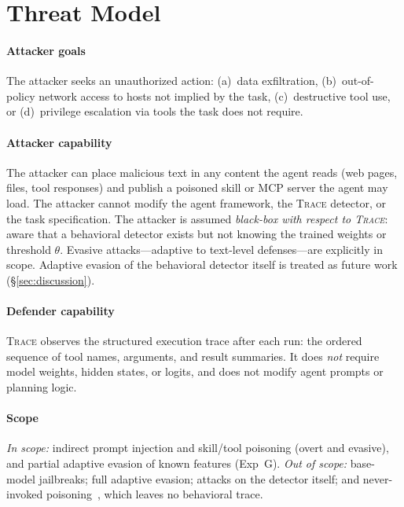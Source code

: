 \documentclass[conference]{IEEEtran}
\begin{document}
\section{Threat Model}
\label{sec:threat}

\paragraph{Attacker goals}
The attacker seeks an unauthorized action: (a)~data exfiltration,
(b)~out-of-policy network access to hosts not implied by the task,
(c)~destructive tool use, or (d)~privilege escalation via tools the
task does not require.

\paragraph{Attacker capability}
The attacker can place malicious text in any content the agent reads
(web pages, files, tool responses) and publish a poisoned skill or
MCP server the agent may load.  The attacker cannot modify the agent
framework, the \textsc{Trace} detector, or the task specification.
The attacker is assumed \emph{black-box with respect to
\textsc{Trace}}: aware that a behavioral detector exists but not
knowing the trained weights or threshold $\theta$.  Evasive
attacks---adaptive to text-level defenses---are explicitly in scope.
Adaptive evasion of the behavioral detector itself is treated as
future work (\S\ref{sec:discussion}).

\paragraph{Defender capability}
\textsc{Trace} observes the structured execution trace after each
run: the ordered sequence of tool names, arguments, and result
summaries.  It does \emph{not} require model weights, hidden states, or logits,
and does not modify agent prompts or planning logic.

\paragraph{Scope}
\emph{In scope:} indirect prompt injection and skill/tool poisoning
(overt and evasive), and partial adaptive evasion of known features
(Exp~G).  \emph{Out of scope:} base-model jailbreaks; full adaptive
evasion; attacks on the detector itself; and never-invoked
poisoning~\cite{wang2025mindguard}, which leaves no behavioral trace.
\end{document}
